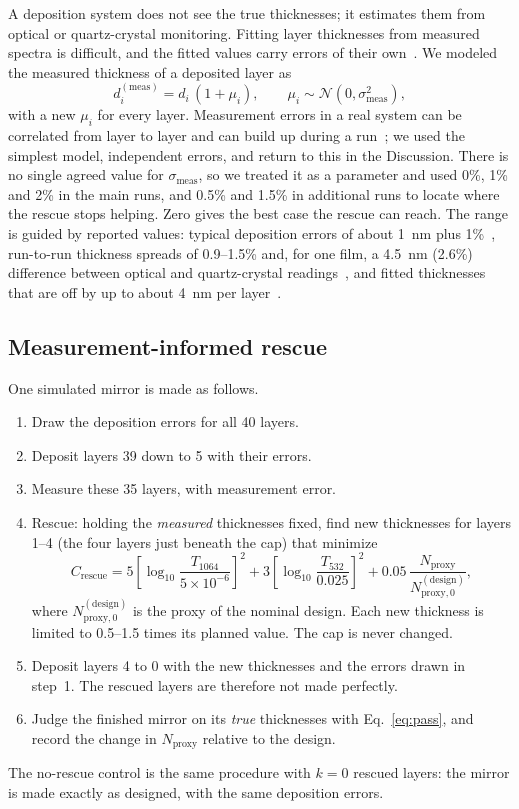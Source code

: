A deposition system does not see the true thicknesses; it estimates them from optical or quartz-crystal monitoring. Fitting layer thicknesses from measured spectra is difficult, and the fitted values carry errors of their own~\cite{Melzig2024}. We modeled the measured thickness of a deposited layer as
\begin{equation}
d_i^{(\mathrm{meas})} = d_i\,(1+\mu_i), \qquad \mu_i \sim \mathcal{N}(0,\sigma_{\mathrm{meas}}^2),
\end{equation}
with a new $\mu_i$ for every layer. Measurement errors in a real system can be correlated from layer to layer and can build up during a run~\cite{Tikhonravov2006}; we used the simplest model, independent errors, and return to this in the Discussion. There is no single agreed value for $\sigma_{\mathrm{meas}}$, so we treated it as a parameter and used 0\%, 1\% and 2\% in the main runs, and 0.5\% and 1.5\% in additional runs to locate where the rescue stops helping. Zero gives the best case the rescue can reach. The range is guided by reported values: typical deposition errors of about 1~nm plus 1\%~\cite{Tikhonravov2012}, run-to-run thickness spreads of 0.9--1.5\% and, for one film, a 4.5~nm (2.6\%) difference between optical and quartz-crystal readings~\cite{Wilbrandt2008}, and fitted thicknesses that are off by up to about 4~nm per layer~\cite{Melzig2024}.

\subsection{Measurement-informed rescue}

One simulated mirror is made as follows.
\begin{enumerate}
\item Draw the deposition errors for all 40 layers.
\item Deposit layers 39 down to 5 with their errors.
\item Measure these 35 layers, with measurement error.
\item Rescue: holding the \emph{measured} thicknesses fixed, find new thicknesses for layers 1--4 (the four layers just beneath the cap) that minimize
\begin{equation}
C_{\mathrm{rescue}} = 5\left[\log_{10}\frac{T_{1064}}{5\times10^{-6}}\right]^2
  + 3\left[\log_{10}\frac{T_{532}}{0.025}\right]^2
  + 0.05\,\frac{N_{\mathrm{proxy}}}{N_{\mathrm{proxy},0}^{(\mathrm{design})}} ,
\label{eq:rescuecost}
\end{equation}
where $N_{\mathrm{proxy},0}^{(\mathrm{design})}$ is the proxy of the nominal design. Each new thickness is limited to 0.5--1.5 times its planned value. The cap is never changed.
\item Deposit layers 4 to 0 with the new thicknesses and the errors drawn in step~1. The rescued layers are therefore not made perfectly.
\item Judge the finished mirror on its \emph{true} thicknesses with Eq.~\eqref{eq:pass}, and record the change in $N_{\mathrm{proxy}}$ relative to the design.
\end{enumerate}
The no-rescue control is the same procedure with $k=0$ rescued layers: the mirror is made exactly as designed, with the same deposition errors.

